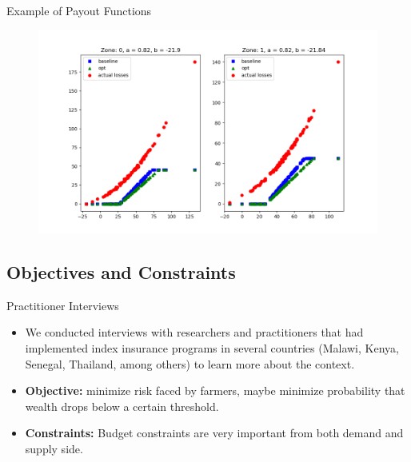 \documentclass{beamer}
\begin{document}
\begin{frame}{Example of Payout Functions}
    \begin{figure}
        \includegraphics[width=\textwidth]{../../../output/figures/Bootstrap/pos_corr_nonlinear_premium.png}
    \end{figure}
\end{frame}

\subsection{Objectives and Constraints}
\begin{frame}{Practitioner Interviews}
\begin{itemize}
   \setlength\itemsep{2em}
    \item We conducted interviews with researchers and practitioners that had implemented index insurance programs in several countries (Malawi, Kenya, Senegal, Thailand, among others) to learn more about the context. 
    \item \textbf{Objective:} minimize risk faced by farmers, maybe minimize probability that wealth drops below a certain threshold.
    \item \textbf{Constraints:} Budget constraints are very important from both demand and supply side.
\end{itemize}    
\end{frame}
\end{document}
